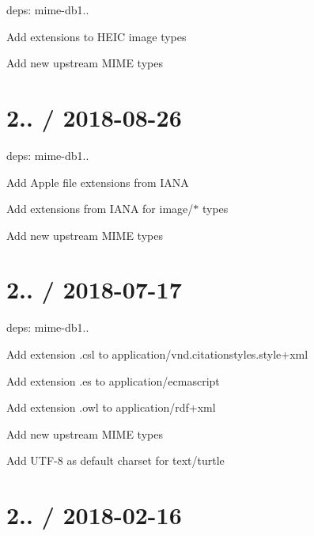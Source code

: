 \begin{DoxyItemize}
\item deps\+: mime-\/db1..
\begin{DoxyItemize}
\item Add extensions to H\+E\+IC image types
\item Add new upstream M\+I\+ME types
\end{DoxyItemize}
\end{DoxyItemize}

\section*{2.. / 2018-\/08-\/26 }


\begin{DoxyItemize}
\item deps\+: mime-\/db1..
\begin{DoxyItemize}
\item Add Apple file extensions from I\+A\+NA
\item Add extensions from I\+A\+NA for {\ttfamily image/$\ast$} types
\item Add new upstream M\+I\+ME types
\end{DoxyItemize}
\end{DoxyItemize}

\section*{2.. / 2018-\/07-\/17 }


\begin{DoxyItemize}
\item deps\+: mime-\/db1..
\begin{DoxyItemize}
\item Add extension {\ttfamily .csl} to {\ttfamily application/vnd.\+citationstyles.\+style+xml}
\item Add extension {\ttfamily .es} to {\ttfamily application/ecmascript}
\item Add extension {\ttfamily .owl} to {\ttfamily application/rdf+xml}
\item Add new upstream M\+I\+ME types
\item Add U\+T\+F-\/8 as default charset for {\ttfamily text/turtle}
\end{DoxyItemize}
\end{DoxyItemize}

\section*{2.. / 2018-\/02-\/16 }


